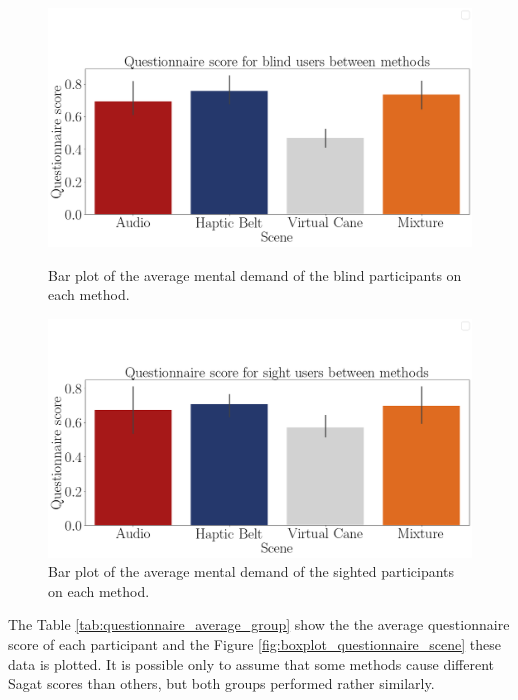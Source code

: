 \begin{figure}[!htb]
    \centering
    \begin{minipage}{\textwidth}
        \centering
        \includegraphics[width = 0.8\linewidth]{Resultados/Questionario/Figuras/png/barplot_questionnaire_scene_blind.png}
        \caption{Bar plot of the average mental demand of the blind participants on each method.}
        \label{fig:barplot_questionnaire_scene_blind}
    \end{minipage}
    \begin{minipage}{\textwidth}
        \centering
        \includegraphics[width = 0.8\linewidth]{Resultados/Questionario/Figuras/png/barplot_questionnaire_scene_sight.png}
        \caption{Bar plot of the average mental demand of the sighted participants on each method.}
        \label{fig:barplot_questionnaire_scene_sight}
    \end{minipage}
\end{figure}

The Table \ref{tab:questionnaire_average_group} show the the average questionnaire score of each participant and the Figure \ref{fig:boxplot_questionnaire_scene} these data is plotted. It is possible only to assume that some methods cause different Sagat scores than others, but both groups performed rather similarly.

